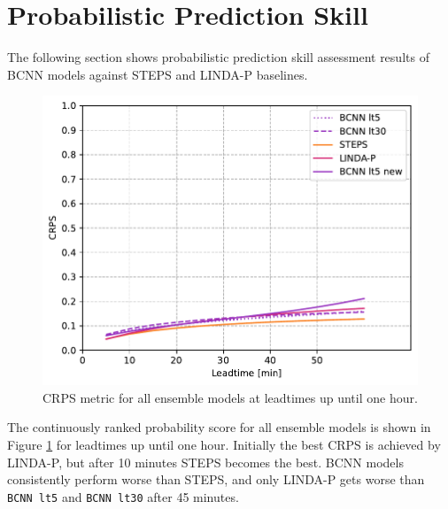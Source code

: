 \section{Probabilistic Prediction Skill}

The following section shows probabilistic prediction skill assessment results of BCNN models against STEPS and LINDA-P baselines.

\begin{figure}[H]
	\centering
	\includegraphics[width=0.6\linewidth]{images/metrics/ALL_CRPS}
	\caption{CRPS metric for all ensemble models at leadtimes up until one hour.}
	\label{fig:crps}
\end{figure}

The continuously ranked probability score for all ensemble models is shown in Figure \ref{fig:crps} for leadtimes up until one hour. Initially the best CRPS is achieved by LINDA-P, but after 10 minutes STEPS becomes the best. BCNN models consistently perform worse than STEPS, and only LINDA-P gets worse than \texttt{BCNN lt5} and \texttt{BCNN lt30} after 45 minutes.

